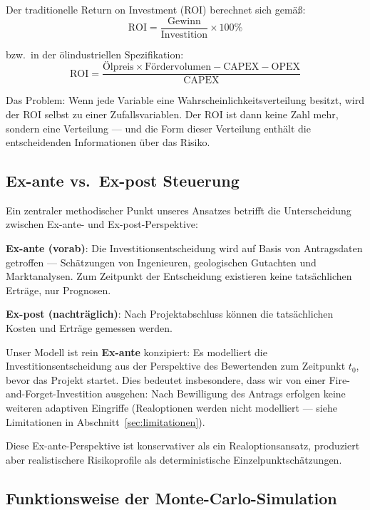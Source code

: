 \documentclass[12pt,a4paper]{article}
\begin{document}
Der traditionelle Return on Investment (ROI) berechnet sich gemäß:
\begin{equation}
\text{ROI} = \frac{\text{Gewinn}}{\text{Investition}} \times 100\%
\end{equation}

bzw.\ in der ölindustriellen Spezifikation:
\begin{equation}
\text{ROI} = \frac{\text{Ölpreis} \times \text{Fördervolumen} - \text{CAPEX} - \text{OPEX}}{\text{CAPEX}}
\end{equation}

Das Problem: Wenn jede Variable eine Wahrscheinlichkeitsverteilung besitzt, wird der ROI selbst zu einer Zufallsvariablen. Der \glqq ROI\grqq{} ist dann keine Zahl mehr, sondern eine Verteilung — und die Form dieser Verteilung enthält die entscheidenden Informationen über das Risiko.

\subsection{Ex-ante vs.\ Ex-post Steuerung}

Ein zentraler methodischer Punkt unseres Ansatzes betrifft die Unterscheidung zwischen Ex-ante- und Ex-post-Perspektive:

\textbf{Ex-ante (vorab)}: Die Investitionsentscheidung wird auf Basis von Antragsdaten getroffen — Schätzungen von Ingenieuren, geologischen Gutachten und Marktanalysen. Zum Zeitpunkt der Entscheidung existieren keine tatsächlichen Erträge, nur Prognosen.

\textbf{Ex-post (nachträglich)}: Nach Projektabschluss können die tatsächlichen Kosten und Erträge gemessen werden.

Unser Modell ist rein \textbf{Ex-ante} konzipiert: Es modelliert die Investitionsentscheidung aus der Perspektive des Bewertenden zum Zeitpunkt $t_0$, bevor das Projekt startet. Dies bedeutet insbesondere, dass wir von einer \glqq Fire-and-Forget\grqq{}-Investition ausgehen: Nach Bewilligung des Antrags erfolgen keine weiteren adaptiven Eingriffe (Realoptionen werden nicht modelliert — siehe Limitationen in Abschnitt~\ref{sec:limitationen}).

Diese Ex-ante-Perspektive ist konservativer als ein Realoptionsansatz, produziert aber realistischere Risikoprofile als deterministische Einzelpunktschätzungen.

\subsection{Funktionsweise der Monte-Carlo-Simulation}
\end{document}
